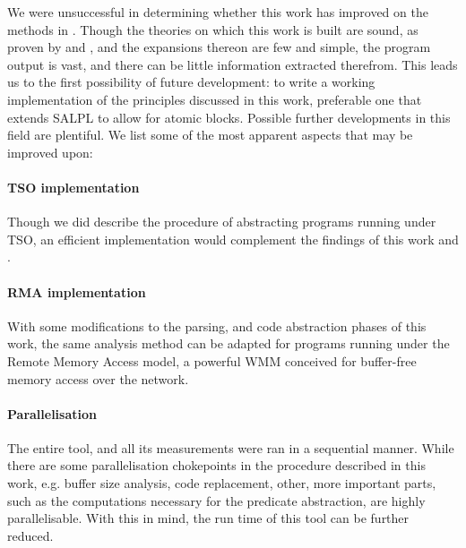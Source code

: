 We were unsuccessful in determining whether this work has improved on the methods in \cite{danetal13}. Though the theories on which this work is built are sound, as proven by \cite{danetal13} and \cite{balletal01}, and the expansions thereon are few and simple, the program output is vast, and there can be little information extracted therefrom. This leads us to the first possibility of future development: to write a working implementation of the principles discussed in this work, preferable one that extends SALPL to allow for atomic blocks. Possible further developments in this field are plentiful. We list some of the most apparent aspects that may be improved upon:

\paragraph{TSO implementation}

Though we did describe the procedure of abstracting programs running under TSO, an efficient implementation would complement the findings of this work and \cite{danetal13}.

\paragraph{RMA implementation}

With some modifications to the parsing, and code abstraction phases of this work, the same analysis method can be adapted for programs running under the Remote Memory Access model, a powerful WMM conceived for buffer-free memory access over the network.

\paragraph{Parallelisation}

The entire tool, and all its measurements were ran in a sequential manner. While there are some parallelisation chokepoints in the procedure described in this work, e.g. buffer size analysis, code replacement, other, more important parts, such as the computations necessary for the predicate abstraction, are highly parallelisable. With this in mind, the run time of this tool can be further reduced.